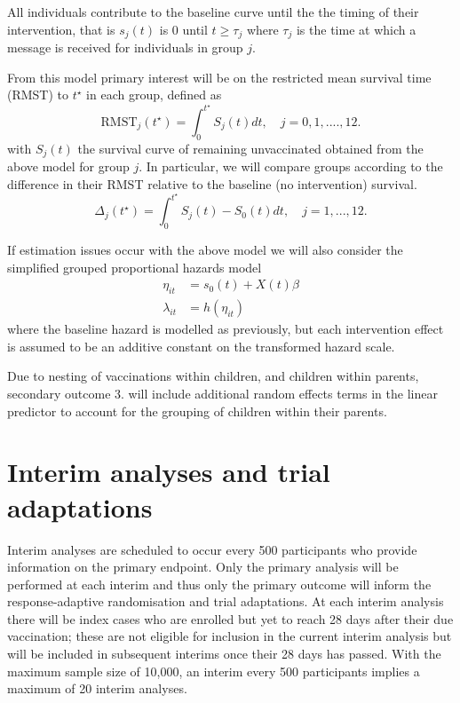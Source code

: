 \documentclass[
  bibliography=totoc]{scrreprt}
\begin{document}
All individuals contribute to the baseline curve until the the timing of their intervention, that is \(s_j(t)\) is 0 until \(t \geq \tau_j\) where \(\tau_j\) is the time at which a message is received for individuals in group \(j\).

From this model primary interest will be on the restricted mean survival time (RMST) \citep{royston2011, royston2013} to \(t^\star\) in each group, defined as
\[
\text{RMST}_j(t^\star) = \int_0^{t^\star} S_j(t) dt,\quad j=0,1,....,12.
\]
with \(S_j(t)\) the survival curve of remaining unvaccinated obtained from the above model for group \(j\).
In particular, we will compare groups according to the difference in their RMST relative to the baseline (no intervention) survival.
\[
\Delta_j(t^\star) = \int_0^{t^\star} S_j(t) - S_0(t)dt,\quad j=1,...,12.
\]

If estimation issues occur with the above model we will also consider the simplified grouped proportional hazards model
\[
\begin{aligned}
\eta_{it} &= s_0(t)  + X(t)\beta \\
\lambda_{it} &= h(\eta_{it})
\end{aligned}
\]
where the baseline hazard is modelled as previously, but each intervention effect is assumed to be an additive constant on the transformed hazard scale.

Due to nesting of vaccinations within children, and children within parents, secondary outcome 3. will include additional random effects terms in the linear predictor to account for the grouping of children within their parents.

\hypertarget{interim-analyses-and-trial-adaptations}{%
\section{Interim analyses and trial adaptations}\label{interim-analyses-and-trial-adaptations}}

Interim analyses are scheduled to occur every 500 participants who provide information on the primary endpoint.
Only the primary analysis will be performed at each interim and thus only the primary outcome will inform the response-adaptive randomisation and trial adaptations.
At each interim analysis there will be index cases who are enrolled but yet to reach 28 days after their due vaccination; these are not eligible for inclusion in the current interim analysis but will be included in subsequent interims once their 28 days has passed.
With the maximum sample size of 10,000, an interim every 500 participants implies a maximum of 20 interim analyses.
\end{document}

